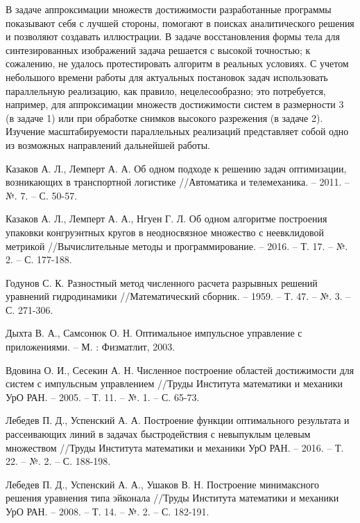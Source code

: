 \documentclass[a4paper,12pt]{article}
\begin{document}
В задаче аппроксимации множеств достижимости разработанные программы
показывают себя с лучшей стороны, помогают в поисках аналитического
решения и позволяют создавать иллюстрации. В задаче восстановления
формы тела для синтезированных изображений задача решается с высокой
точностью; к сожалению, не удалось протестировать алгоритм в реальных
условиях. С учетом небольшого времени работы для актуальных постановок
задач использовать параллельную реализацию, как правило,
нецелесообразно; это потребуется, например, для аппроксимации множеств
достижимости систем в размерности 3 (в задаче 1) или при обработке
снимков высокого разрежения (в задаче 2). Изучение масштабируемости
параллельных реализаций представляет собой одно из возможных
направлений дальнейшей работы.
\pagebreak
\begin{thebibliography}{99}


Казаков А. Л., Лемперт А. А. Об одном подходе к
  решению задач оптимизации, возникающих в транспортной логистике
  //Автоматика и телемеханика. – 2011. – №. 7. – С. 50-57.

Казаков А. Л., Лемперт А. А., Нгуен Г. Л. Об одном
  алгоритме построения упаковки конгруэнтных кругов в неодносвязное
  множество с неевклидовой метрикой //Вычислительные методы и
  программирование. – 2016. – Т. 17. – №. 2. – С. 177-188.

Годунов С. К. Разностный метод численного расчета
  разрывных решений уравнений гидродинамики //Математический
  сборник. – 1959. – Т. 47. – №. 3. – С. 271-306.
  
Дыхта В. А., Самсонюк О. Н. Оптимальное импульсное
  управление с приложениями. – М. : Физматлит, 2003.

 Вдовина О. И., Сесекин А. Н. Численное построение
  областей достижимости для систем с импульсным управлением //Труды
  Института математики и механики УрО РАН. – 2005. – Т. 11. – №. 1. –
  С. 65-73.

 Лебедев П. Д., Успенский А. А. Построение функции
  оптимального результата и рассеивающих линий в задачах
  быстродействия с невыпуклым целевым множеством //Труды Института
  математики и механики УрО РАН. – 2016. – Т. 22. – №. 2. –
  С. 188-198.

  
 Лебедев П. Д., Успенский А. А., Ушаков
  В. Н. Построение минимаксного решения уравнения типа эйконала
  //Труды Института математики и механики УрО РАН. – 2008. – Т. 14. –
  №. 2. – С. 182-191.
  

\end{thebibliography}
\end{document}
